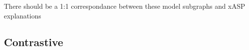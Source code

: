 \begin{proposition}
  There should be a 1:1 correspondance between these model subgraphs and xASP explanations \cite{altrsoba23a} 
\end{proposition}


\subsection{Contrastive}


